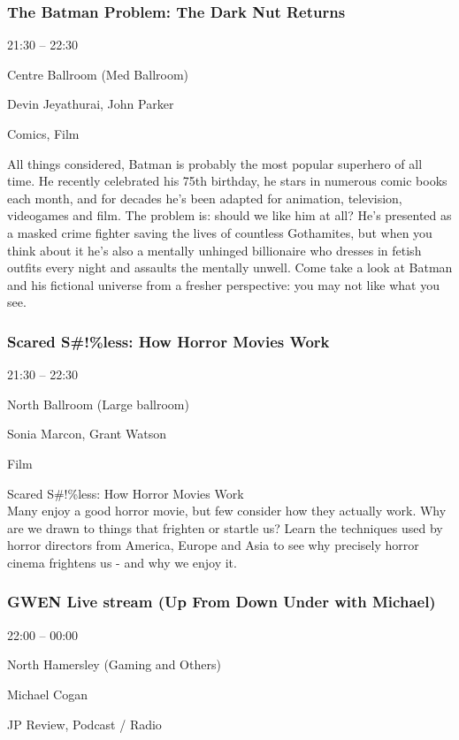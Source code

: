 \documentclass{scrreprt}
\begin{document}
\begin{multicols}{2}
\subsubsection*{The Batman Problem: The Dark Nut Returns}\begin{description}
\setlength{\itemsep}{0pt}
\setlength{\parsep}{0pt}
\setlength{\parskip}{0pt}
\item[Time:]{21:30 -- 22:30}
\item[Venue:]{Centre Ballroom (Med Ballroom)}
\item[People:]{Devin Jeyathurai, John Parker}
\item[Tags:]{Comics, Film}\end{description}
All things considered, Batman is probably the most popular superhero of all time. He recently celebrated his 75th birthday, he stars in numerous comic books each month, and for decades he’s been adapted for animation, television, videogames and film. The problem is: should we like him at all? He’s presented as a masked crime fighter saving the lives of countless Gothamites, but when you think about it he’s also a mentally unhinged billionaire who dresses in fetish outfits every night and assaults the mentally unwell. Come take a look at Batman and his fictional universe from a fresher perspective: you may not like what you see.
\subsubsection*{Scared S\#!\%less: How Horror Movies Work}\begin{description}
\setlength{\itemsep}{0pt}
\setlength{\parsep}{0pt}
\setlength{\parskip}{0pt}
\item[Time:]{21:30 -- 22:30}
\item[Venue:]{North Ballroom (Large ballroom)}
\item[People:]{Sonia Marcon, Grant Watson}
\item[Tags:]{Film}\end{description}
Scared S\#!\%less: How Horror Movies Work\\Many enjoy a good horror movie, but few consider how they actually work. Why are we drawn to things that frighten or startle us? Learn the techniques used by horror directors from America, Europe and Asia to see why precisely horror cinema frightens us - and why we enjoy it.
\subsubsection*{GWEN Live stream (Up From Down Under with Michael)}\begin{description}
\setlength{\itemsep}{0pt}
\setlength{\parsep}{0pt}
\setlength{\parskip}{0pt}
\item[Time:]{22:00 -- 00:00}
\item[Venue:]{North Hamersley (Gaming and Others)}
\item[People:]{Michael Cogan}
\item[Tags:]{JP Review, Podcast / Radio}\end{description}


\end{multicols}
\end{document}
